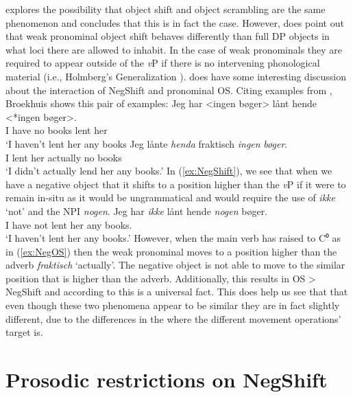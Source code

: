\documentclass[12pt, letterpaper]{article}
\begin{document}
\ea \cite{broekhuisUnificationObjectShift2020} explores the possibility that object shift and object scrambling are the same phenomenon and concludes that this is in fact the case.
\ex However, \citeauthor[417f]{broekhuisUnificationObjectShift2020} does point out that weak pronominal object shift behaves differently than full DP objects in what loci there are allowed to inhabit. In the case of weak pronominals they are required to appear outside of the \textit{v}P if there is no intervening phonological material (i.e., Holmberg's Generalization \cite{holmbergWordOrderSyntactic1986,holmbergRemarksHolmbergGeneralization1999}).
\ex \citeauthor{broekhuisUnificationObjectShift2020} does have some interesting discussion about the interaction of NegShift and pronominal OS. 
\ex Citing examples from \citet[163ff]{christensenInterfacesNegationSyntax2005}, Broekhuis shows this pair of examples:
	\ea \label{ex:NegShift}
	\gll Jeg har <ingen bøger> lånt hende <*ingen bøger>.\\
	I have no books lent her\\
	\glt `I haven't lent her any books
	\ex \label{ex:NegOS}
	\gll Jeg lånte \textit{henda} fraktisch \textit{ingen} \textit{bøger}.\\
	I lent her actually no books\\
	\glt `I didn't actually lend her any books.'
	\z
\ex In (\ref{ex:NegShift}), we see that when we have a negative object that it shifts to a position higher than the \textit{v}P if it were to remain in-situ as it would be ungrammatical and would require the use of \textit{ikke} `not' and the NPI \textit{nogen}.
	\ea
	\gll Jeg har \textit{ikke} lånt hende \textit{nogen} bøger.\\
	I have not lent her any books.\\
	\glt `I haven't lent her any books.'
	\z
\ex However, when the main verb has raised to C⁰ as in (\ref{ex:NegOS}) then the weak pronominal moves to a position higher than the adverb \textit{fraktisch} `actually'. The negative object is not able to move to the similar position that is higher than the adverb. Additionally, this results in OS > NegShift and according to \citeauthor{broekhuisUnificationObjectShift2020} this is a universal fact.
\ex This does help us see that that even though these two phenomena appear to be similar they are in fact slightly different, due to the differences in the where the different movement operations' target is.
\z

\section{Prosodic restrictions on NegShift} \label{sec:NEGSHIFT}
\end{document}
